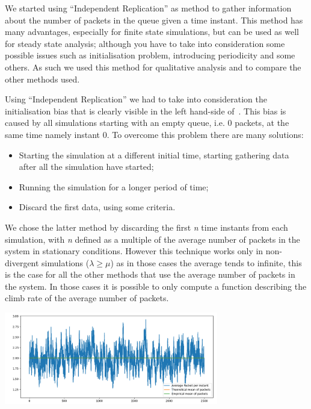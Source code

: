 \documentclass[10pt,a4paper]{article}
\begin{document}
We started using ``Independent Replication'' as method to gather information about the number of packets in the queue given a time instant. This method has many advantages, especially for finite state simulations, but can be used as well for steady state analysis; although you have to take into consideration some possible issues such as initialisation problem, introducing periodicity and some others. As such we used this method for qualitative analysis and to compare the other methods used.


Using ``Independent Replication'' we had to take into consideration the initialisation bias that is clearly visible in the left hand-side of~. This bias is caused by all simulations starting with an empty queue, i.e. 0 packets, at the same time namely instant 0. To overcome this problem there are many solutions:
\begin{itemize}
\item Starting the simulation at a different initial time, starting gathering data after all the simulation have started;
\item Running the simulation for a longer period of time;
\item Discard the first data, using some criteria.
\end{itemize}

We chose the latter method by discarding the first \emph{n} time instants from each simulation, with \emph{n} defined as a multiple of the average number of packets in the system in stationary conditions. However this technique works only in non-divergent simulations (\(\lambda\geq\mu\)) as in those cases the average tends to infinite, this is the case for all the other methods that use the average number of packets in the system. In those cases it is possible to only compute a function describing the climb rate of the average number of packets.

\begin{center}
  \includegraphics[width=0.7\textwidth]{independent-replication-without-bias.png}
  \label{fig:independent-replication-without-bias}
\end{center}
\end{document}
